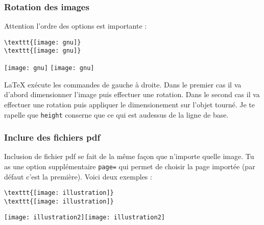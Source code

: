 \documentclass[10pt,hyperref={pdfpagemode=FullScreen},xcolor=dvipsnames,xcolor=table, xcolor=svgnames]{beamer}%
\newcommand{\latex}{\LaTeX\xspace}
\begin{document}
 \begin{frame}[fragile]
   \frametitle{Rotation des images}
 \alert{Attention} l'ordre des options est importante : 
\begin{exampleblock}{}
\begin{verbatim}
\texttt{[image: gnu]} 
\texttt{[image: gnu]}
\end{verbatim}
\end{exampleblock}
\vspace{1cm}
\hspace{2cm}\texttt{[image: gnu]} \hfill \texttt{[image: gnu]}\hspace{2cm}
\par\vspace{0.5cm}
\latex exécute les commandes de gauche à droite. Dans le premier cas il va d'abord dimensionner l'image puis effectuer une rotation. Dans le second cas il va effectuer une rotation puis appliquer le dimensionement sur l'objet tourné. Je te rapelle que {\color{blue}\verb!height!} conserne que ce qui est audessus de la ligne de base.

\end{frame}
 \begin{frame}[fragile]
   \frametitle{Inclure des fichiers pdf}
Inclusion de fichier pdf se fait de la même façon que n'importe quelle image. Tu as une option supplémentaire  {\color{blue}\verb!page=!} qui permet de choisir la page importée (par défaut c'est la première). Voici deux exemples :
\begin{exampleblock}{}
\begin{verbatim}
\texttt{[image: illustration]}
\texttt{[image: illustration]}
\end{verbatim}
\end{exampleblock}
\hspace{1cm}\texttt{[image: illustration2]}\hfill \texttt{[image: illustration2]}\hspace{1cm}
\end{frame}
\end{document}
